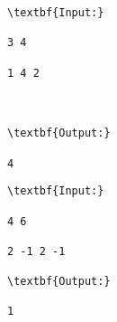 \begin{verbatim}
\textbf{Input:}

3 4

1 4 2



\textbf{Output:}

4

\end{verbatim}
\begin{verbatim}
\textbf{Input:}

4 6

2 -1 2 -1

\textbf{Output:}

1

\end{verbatim}
